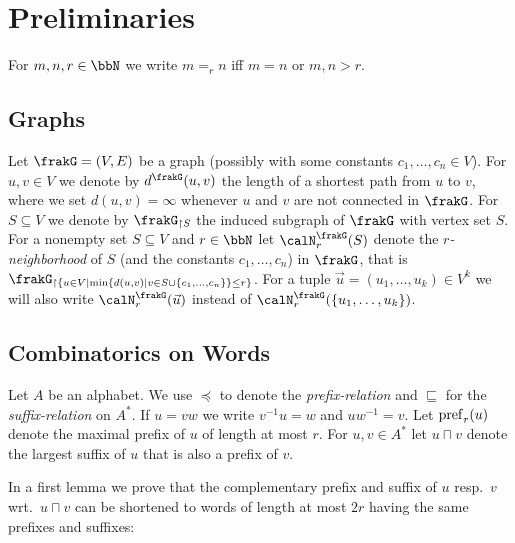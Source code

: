 \section{Preliminaries}
For $m,n,r\in\bbN$ we write $m =_r n$ iff $m=n$ or $m,n>r$.

\subsection{Graphs}
Let $\frakG=(V,E)$ be a graph (possibly with some constants $c_1,\dots,c_n\in V$). 
For $u,v\in V$ we denote by $d^\frakG(u,v)$ the length of a shortest path from $u$ to $v$, where we set $d(u,v) = \infty$ whenever $u$ and $v$ are not connected in $\frakG$.
For $S\subseteq V$ we denote by $\frakG_{\upharpoonright S}$ the induced subgraph of $\frakG$ with vertex set $S$. 
For a nonempty set $S\subseteq V$ and $r\in \bbN$ let $\calN_r^\frakG(S)$ denote the \emph{$r$-neighborhood} of $S$ (and the constants $c_1,\dots,c_n$) in $\frakG$, that is $\frakG_{\upharpoonright\{u\in V\mid \min\{d(u,v) \mid v\in S\cup\{c_1,\dots,c_n\}\} \leq r \}}$.
For a tuple $\vec{u} = (u_1,\ldots, u_k) \in V^k$ we will also write $\calN^\frakG_r(\vec{u})$ instead of $\calN^\frakG_r(\{u_1,\ldots, u_k\})$.

\subsection{Combinatorics on Words}
Let $A$ be an alphabet. We use $\preceq$ to denote the \emph{prefix-relation} and $\sqsubseteq$ for the \emph{suffix-relation} on $A^\ast$.  If $u= vw$ we write $v^{-1}u = w$ and
$uw^{-1} = v$.
Let $\operatorname{pref}_r(u)$ denote the maximal prefix of $u$ of length at most $r$. For $u,v\in A^\ast$ let $u \sqcap v$ denote the largest suffix of $u$ that is also a prefix of $v$.

In a first lemma we prove that the complementary prefix and suffix of $u$ resp.~$v$ wrt.~$u\sqcap v$ can be shortened to words of length at most $2r$ having the same prefixes and suffixes:

